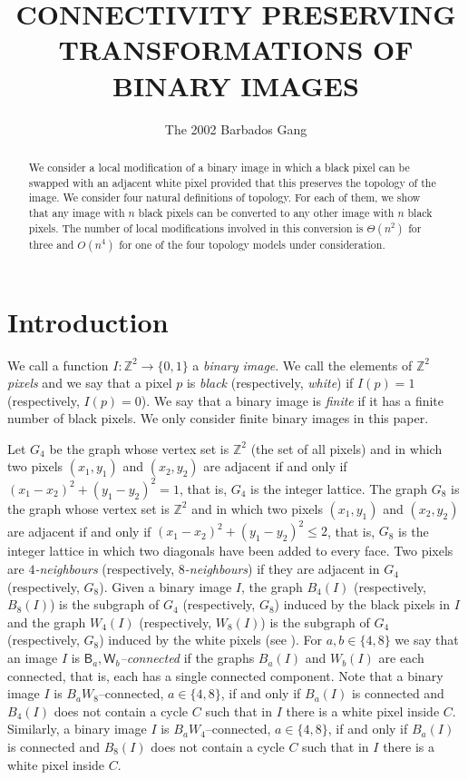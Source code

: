 \documentclass[lotsofwhite,charterfonts]{patmorin}
\title{\MakeUppercase{Connectivity Preserving Transformations 
	of Binary Images}}
\author{The 2002 Barbados Gang}
\date{}
\newcommand{\Z}{\mathbb{Z}}
\begin{document}
\maketitle

\begin{abstract} 
We consider a local modification of a binary image
in which a black pixel can be swapped with an adjacent white pixel
provided that this preserves the topology of the image. We consider four natural definitions of topology. For each of them, we show that any image with $n$ black pixels can be converted to any other image with $n$ black pixels. The number of local modifications involved in this conversion is $\Theta(n^2)$ for three and $O(n^4)$ for one of the four topology models under consideration.
\end{abstract}

\section{Introduction}

We call a function $I:\Z^2\rightarrow\{0,1\}$ a \emph{binary image}.
We call the elements of $\Z^2$ \emph{pixels} and we say that a pixel
$p$ is \emph{black} (respectively, \emph{white}) if $I(p)=1$
(respectively, $I(p)=0$).  We say that a binary image is \emph{finite} if it
has a finite number of black pixels. We only consider finite binary images in this paper. 

Let $G_4$ be the graph whose vertex set is $\Z^2$ (the set of all
pixels) and in which two pixels $(x_1,y_1)$ and $(x_2,y_2)$ are
adjacent if and only if $(x_1-x_2)^2+(y_1-y_2)^2=1$, that is, $G_4$ is the integer lattice.  The graph $G_8$ is the graph whose vertex set is $\Z^2$ and
in which two pixels $(x_1,y_1)$ and $(x_2,y_2)$ are adjacent if and only if
$(x_1-x_2)^2+(y_1-y_2)^2\le 2$, that is, $G_8$ is the integer lattice in
which two diagonals have been added to every face. Two pixels are \emph{$4$-neighbours} (respectively, \emph{$8$-neighbours}) if they are adjacent in $G_4$  (respectively, $G_8$). Given a binary image $I$, the graph $B_4(I)$ (respectively, $B_8(I)$) is the subgraph of $G_4$ (respectively, $G_8$) induced by the black pixels in $I$ and the graph $W_4(I)$ (respectively, $W_8(I)$) is the subgraph of $G_4$ (respectively, $G_8$) induced by the white pixels (see ). For $a,b\in\{4,8\}$ we say that an image $I$ is \emph{$\textsf{B}_a,\textsf{W}_b$--connected} if the graphs $B_a(I)$ and $W_b(I)$ are each connected, that is, each has a single connected component. Note that a binary image $I$ is $B_aW_8$--connected, $a\in\{4,8\}$, if and only if $B_a(I)$ is connected and $B_4(I)$ does not contain a cycle $C$ such that in $I$ there is a white pixel inside $C$. Similarly, a binary image $I$ is $B_aW_4$--connected, $a\in\{4,8\}$, if and only if $B_a(I)$ is connected and $B_8(I)$ does not contain a cycle $C$ such that in $I$ there is a white pixel inside $C$. 
\end{document}

